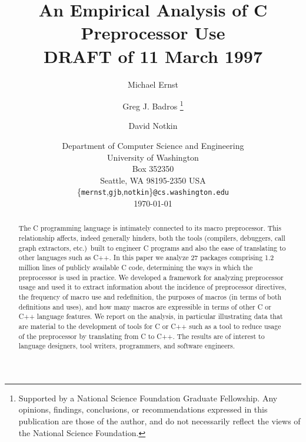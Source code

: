 \documentclass[11pt]{article}
\def\numpackages{27}
\def\numlines{1.2 million}
\begin{document}
% 


\title{An Empirical Analysis of C Preprocessor Use \\ DRAFT of 11 March 1997}

\author{Michael Ernst%
  \and Greg J. Badros%
  \thanks{Supported by a National Science Foundation
    Graduate Fellowship. Any opinions, findings, conclusions, or
    recommendations expressed in this publication are those of the
    author, and do not necessarily reflect the views of the National
    Science Foundation.}
  \and David Notkin}

\date{Department of Computer Science and Engineering \\
University of Washington \\
Box 352350 \\
Seattle, WA  98195-2350  USA \\
{\small \{{\tt mernst},{\tt gjb},{\tt notkin}\}{\tt @cs.washington.edu}} \\
\today}  

\maketitle

\begin{abstract}

  The C programming language is intimately connected to its macro
  preprocessor.  This relationship affects, indeed generally hinders, both
  the tools (compilers, debuggers, call graph extractors, etc.)\ built to
  engineer C programs and also the ease of translating to other languages
  such as C++.  In this paper we analyze {\numpackages} packages comprising
  {\numlines} lines of publicly available C code, determining the ways in
  which the preprocessor is used in practice.  We developed a framework for
  analyzing preprocessor usage and used it to extract information about the
  incidence of preprocessor directives, the frequency of macro use and
  redefinition, the purposes of macros (in terms of both definitions and
  uses), and how many macros are expressible in terms of other C or C++
  language features.  We report on the analysis, in particular illustrating
  data that are material to the development of tools for C or C++ such as a
  tool to reduce usage of the preprocessor by translating from C to C++.
  The results are of interest to language designers, tool writers,
  programmers, and software engineers.
\end{abstract}
\end{document}
